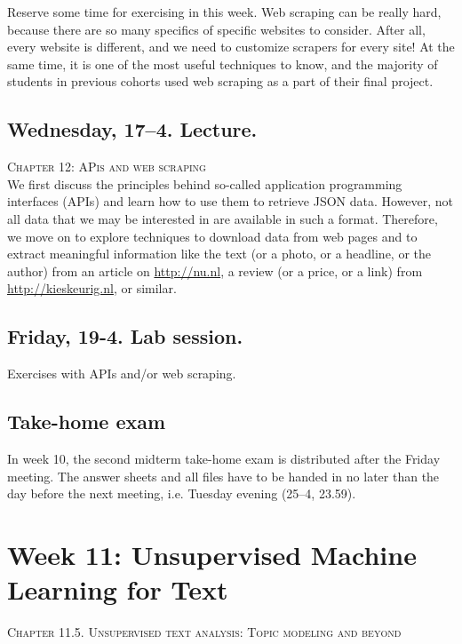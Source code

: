Reserve some time for exercising in this week. Web scraping can be really hard, because there are so many specifics of specific websites to consider. After all, every website is different, and we need to customize scrapers for every site! At the same time, it is one of the most useful techniques to know, and the majority of students in previous cohorts used web scraping as a part of their final project.

\subsection*{Wednesday, 17--4. Lecture.}
\textsc{ Chapter 12: APis and web scraping}\\

We first discuss the principles behind so-called application programming interfaces (APIs) and learn how to use them to retrieve JSON data. However, not all data that we may be interested in are available in such a format. Therefore, we move on to explore techniques to download data from web pages and to extract meaningful information like the text (or a photo, or a headline, or the author) from an article on \url{http://nu.nl}, a review (or a price, or a link) from \url{http://kieskeurig.nl}, or similar.



\subsection*{Friday, 19-4. Lab session.}

Exercises with APIs and/or web scraping.


\subsection*{Take-home exam}
In week 10, the second midterm take-home exam is distributed after the Friday meeting. The answer sheets and all files have to be handed in no later than the day before the next meeting, i.e. Tuesday evening (25--4, 23.59).






\section*{Week 11: Unsupervised Machine Learning for Text}
\textsc{ Chapter 11.5. Unsupervised text analysis: Topic modeling and beyond}\\

